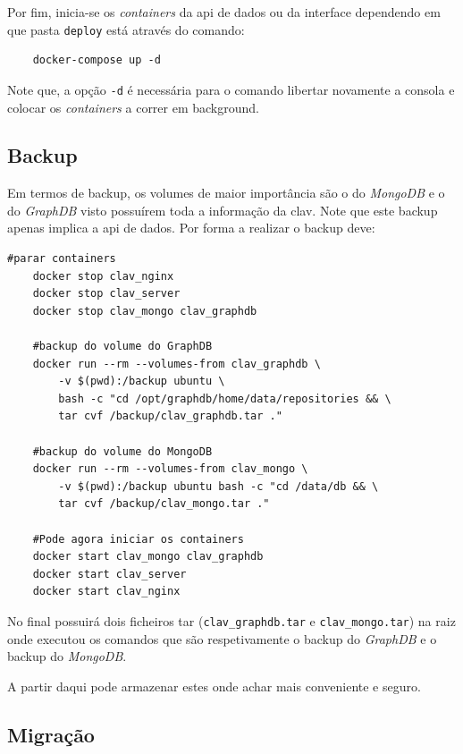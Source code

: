 Por fim, inicia-se os \textit{containers} da \acrshort{api} de dados ou da interface dependendo em que pasta \texttt{deploy} está através do comando:
\footnotesize
\begin{verbatim}
    docker-compose up -d
\end{verbatim}
\normalsize

Note que, a opção \texttt{-d} é necessária para o comando libertar novamente a consola e colocar os \textit{containers} a correr em background.

\subsection{Backup}\label{sec:inst-backup}

Em termos de backup, os volumes de maior importância são o do \textit{MongoDB} e o do \textit{GraphDB} visto possuírem toda a informação da \acrshort{clav}. Note que este backup apenas implica a \acrshort{api} de dados. Por forma a realizar o backup deve:
\begin{lstlisting}[caption=Backup dos volumes do \textit{docker}]
    #parar containers
    docker stop clav_nginx
    docker stop clav_server
    docker stop clav_mongo clav_graphdb
    
    #backup do volume do GraphDB
    docker run --rm --volumes-from clav_graphdb \
        -v $(pwd):/backup ubuntu \
        bash -c "cd /opt/graphdb/home/data/repositories && \
        tar cvf /backup/clav_graphdb.tar ."
        
    #backup do volume do MongoDB
    docker run --rm --volumes-from clav_mongo \
        -v $(pwd):/backup ubuntu bash -c "cd /data/db && \
        tar cvf /backup/clav_mongo.tar ."
        
    #Pode agora iniciar os containers
    docker start clav_mongo clav_graphdb
    docker start clav_server
    docker start clav_nginx
\end{lstlisting}

No final possuirá dois ficheiros \acrshort{tar} (\texttt{clav\_graphdb.tar} e \texttt{clav\_mongo.tar}) na raiz onde executou os comandos que são respetivamente o backup do \textit{GraphDB} e o backup do \textit{MongoDB}.

A partir daqui pode armazenar estes onde achar mais conveniente e seguro.

\subsection{Migração}\label{sec:inst-migracao}

